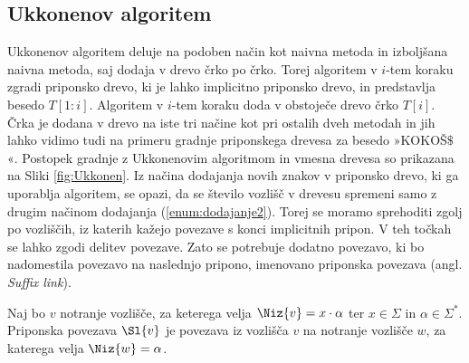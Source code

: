 \subsection{Ukkonenov algoritem}
Ukkonenov algoritem deluje na podoben način kot naivna metoda in izboljšana naivna metoda, saj dodaja v drevo črko po črko. Torej algoritem v $i$-tem koraku zgradi priponsko drevo, ki je lahko implicitno priponsko drevo, in predstavlja besedo $T[1:i]$. Algoritem v $i$-tem koraku doda v obstoječe drevo črko $T[i]$. Črka je dodana v drevo na iste tri načine kot pri ostalih dveh metodah in jih lahko vidimo tudi na primeru gradnje priponskega drevesa za besedo »KOKOŠ$\$$«. Postopek gradnje z Ukkonenovim algoritmom in vmesna drevesa so prikazana na Sliki \ref{fig:Ukkonen}. Iz načina dodajanja novih znakov v priponsko drevo, ki ga uporablja algoritem, se opazi, da se število vozlišč v drevesu spremeni samo z drugim načinom dodajanja (\ref{enum:dodajanje2}). Torej se moramo sprehoditi zgolj po vozliščih, iz katerih kažejo povezave s konci implicitnih pripon. V teh točkah se lahko zgodi delitev povezave. Zato se potrebuje dodatno povezavo, ki bo nadomestila povezavo na naslednjo pripono, imenovano priponska povezava (angl. \textit{Suffix link}). 

\begin{defi}\label{def:sl}
    Naj bo $v$ notranje vozlišče, za keterega velja $\Niz{v}=x\cdot\alpha$ ter $x\in\Sigma$ in $\alpha\in\Sigma^*$. Priponska povezava $\Sl{v}$ je povezava iz vozlišča $v$ na notranje vozlišče $w$, za katerega velja $\Niz{w}=\alpha$.
\end{defi}

